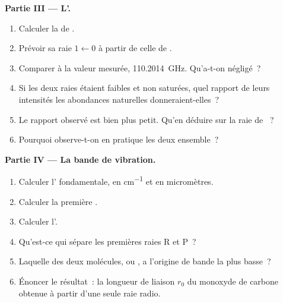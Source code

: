 \begin{problem}
\medskip\noindent\textbf{Partie III --- L'.}
\begin{enumerate}[resume]
  \item Calculer la  de .
  \item Prévoir sa raie $1 \leftarrow 0$ à partir de celle de .
  \item Comparer à la valeur mesurée, \qty{110.2014}{GHz}. Qu'a-t-on
        négligé~?
  \item Si les deux raies étaient faibles et non saturées, quel rapport
        de leurs intensités les abondances naturelles donneraient-elles~?
  \item Le rapport observé est bien plus petit. Qu'en déduire sur la raie
        de ~?
  \item Pourquoi observe-t-on en pratique les deux 
        ensemble~?
\end{enumerate}

\medskip\noindent\textbf{Partie IV --- La bande de vibration.}
\begin{enumerate}[resume]
  \item Calculer l' fondamentale, en \unit{cm^{-1}} et
        en micromètres.
  \item Calculer la première .
  \item Calculer l'.
  \item Qu'est-ce qui sépare les premières raies R et P~?
  \item Laquelle des deux molécules,  ou ,
        a l'origine de bande la plus basse~?
  \item Énoncer le résultat~: la longueur de liaison $r_0$ du monoxyde de
        carbone obtenue à partir d'une seule raie radio.
\end{enumerate}
\end{problem}
